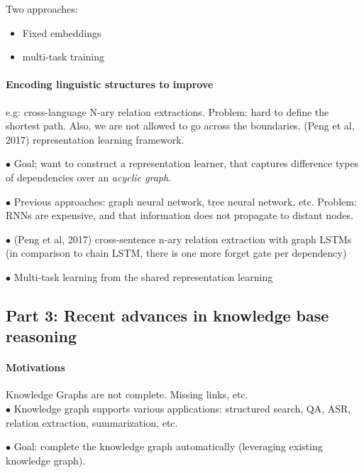 Two approaches:
\begin{itemize}
	\item Fixed embeddings
	\item multi-task training
\end{itemize}

\paragraph{Encoding linguistic structures to improve}
e.g: cross-language N-ary relation extractions. Problem: hard to define the shortest path. Also, we are not allowed to go across the boundaries.
(Peng et al, 2017) representation learning framework.

$\bullet$ Goal; want to construct a representation learner, that captures difference types of dependencies over an \emph{acyclic graph}.

$\bullet$ Previous approaches: graph neural network, tree neural network, etc.
Problem: RNNs are expensive, and that information does not propagate to distant nodes.

$\bullet$ (Peng et al, 2017) cross-sentence n-ary relation extraction with graph LSTMs (in comparison to chain LSTM, there is one more forget gate per dependency)

$\bullet$ Multi-task learning from the shared representation learning


\subsection{Part 3: Recent advances in knowledge base reasoning}

\paragraph{Motivations} Knowledge Graphs are not complete. Missing links, etc.\\

$\bullet$ Knowledge graph supports various applications: structured search, QA, ASR, relation extraction, summarization, etc.

$\bullet$ Goal: complete the knowledge graph automatically (leveraging existing knowledge graph).

